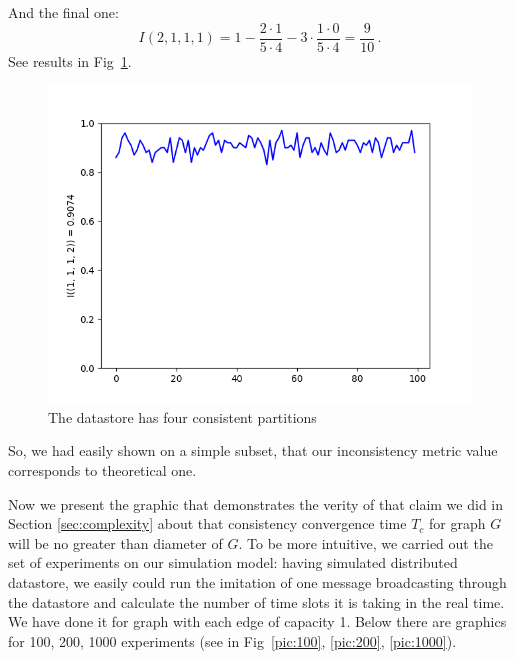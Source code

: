\documentclass[a4paper,14pt]{llncs}
\begin{document}
%
And the final one:
\[
	I(2,1,1,1) = 1 - \frac{2 \cdot 1}{5 \cdot 4} - 3\cdot\frac{1 \cdot 0}{5 \cdot 4} = \frac{9}{10}\,.
\]
See results in Fig~\ref{pic:four_parts}.
\begin{figure}
\centering\includegraphics[scale=0.4]{images/1-1-1-2-consistent-partitions-probability.png}
\caption{The datastore has four consistent partitions}\label{pic:four_parts}
\end{figure}
%
So, we had easily shown on a simple subset, that our inconsistency metric value corresponds to theoretical one.

Now we present the graphic that demonstrates the verity of that claim we did in Section \ref{sec:complexity} about that consistency convergence time $T_c$ for graph $G$ will be no greater than diameter of $G$.
To be more intuitive, we carried out the set of experiments on our simulation model: having simulated distributed datastore, we easily could run the imitation of one message broadcasting through the datastore and calculate the number of time slots it is taking in the real time. We have done it for graph with each edge of capacity 1. Below there are graphics for 100, 200, 1000 experiments (see in Fig~\ref{pic:100}, \ref{pic:200}, \ref{pic:1000}).
\end{document}
